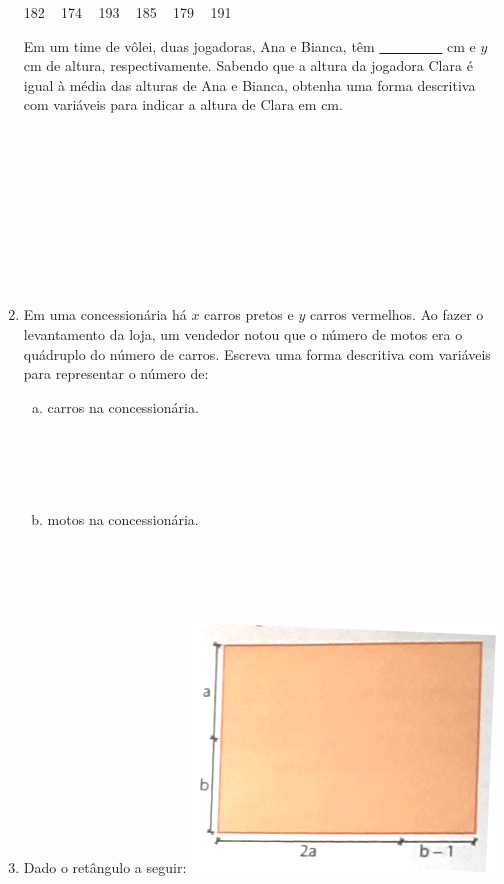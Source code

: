 \documentclass[a4paper,14pt]{article}
\begin{document}
\begin{multicols}{2}
\begin{enumerate}
    		\noindent \begin{tcolorbox}[colback=white, colframe=black, boxrule=0.5mm, width=8cm]
    			182 ~ 174 ~ 193 ~ 185 ~ 179 ~ 191
    		\end{tcolorbox}
    		Em um time de vôlei, duas jogadoras, Ana e Bianca, têm \underline{~~~~~~~~~} cm e $y$ cm de altura, respectivamente. Sabendo que a altura da jogadora Clara é igual à média das alturas de Ana e Bianca, obtenha uma forma descritiva com variáveis para indicar a altura de Clara em cm. \\\\\\\\\\\\\\\\\\\\
    		\item Em uma concessionária há $x$ carros pretos e $y$ carros vermelhos. Ao fazer o levantamento da loja, um vendedor notou que o número de motos era o quádruplo do número de carros. Escreva uma forma descritiva com variáveis para representar o número de:
    		\begin{enumerate}[a)]
    			\item carros na concessionária. \\\\\\\\\\
    			\item motos na concessionária. \\\\\\\\\\
    		\end{enumerate}
    		\item Dado o retângulo a seguir:
    		\includegraphics[width=1\linewidth]{imagens_6FMA94/imagem3}

\end{enumerate}
\end{multicols}
\end{document}
